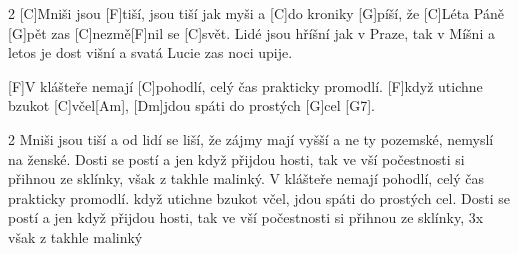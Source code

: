 \begin{multicols}{2} 
[C]Mniši jsou [F]tiší,
jsou tiší jak myši
a [C]do kroniky [G]píší,
že [C]Léta Páně [G]pět
zas [C]nezmě[F]nil se [C]svět.
\slpc
Lidé jsou hříšní
jak v Praze, tak v Míšni
a letos je dost višní
a svatá Lucie
zas noci upije.
\end{multicols}
[F]V klášteře nemají [C]pohodlí,
celý čas prakticky promodlí.
[F]když utichne bzukot [C]včel[Am],
[Dm]jdou spáti do prostých [G]cel [G7].
\begin{multicols}{2} 
	Mniši jsou tiší
	a od lidí se liší,
	že zájmy mají vyšší
	a ne ty pozemské,
	nemyslí na ženské.
	Dosti se postí
	a jen když přijdou hosti,
	tak ve vší počestnosti
	si přihnou ze sklínky,
	však z takhle malinký.\slpc
	V klášteře nemají pohodlí,
	celý čas prakticky promodlí.
	když utichne bzukot včel,
	jdou spáti do prostých cel.
	Dosti se postí
	a jen když přijdou hosti,
	tak ve vší počestnosti
	si přihnou ze sklínky,
	3x však z takhle malinký
\end{multicols}